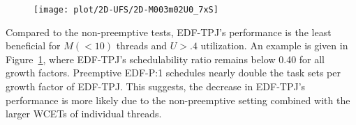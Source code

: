 \begin{figure}
  \texttt{[image: plot/2D-UFS/2D-M003m02U0\_7xS]}%
  \caption{}
  \label{fig:M3U.7}
\end{figure}

Compared to the non-preemptive tests, EDF-TPJ's performance is
the least beneficial for ${M (< 10)}$ threads and ${U > .4}$
utilization. An example is given in Figure~\ref{fig:M3U.7}, where
EDF-TPJ's schedulability ratio remains below 0.40 for all growth
factors. Preemptive EDF-P:1 schedules nearly double the task sets per
growth factor of EDF-TPJ. This suggests, the decrease in EDF-TPJ's
performance is more likely due to the non-preemptive setting combined
with the larger WCETs of individual threads.
